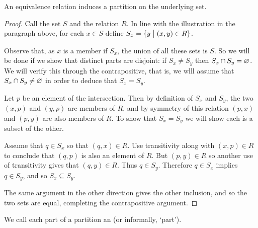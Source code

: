 \medskip
\par{}
An equivalence relation induces a partition on the underlying set.

\begin{proof}
Call the set \( S \) and the relation \( R \).
In line with the illustration in the paragraph above, 
for each \( x\in S \) define \( S_x=\mbox{$\{y\bigm| (x,y)\in R\}$} \).

Observe that, as \( x \) is a member if \( S_x \),
the union of all these sets is \( S \).
So we will be done if we show that distinct parts are disjoint:
if \( S_x\neq S_y \) then \( S_x\cap S_y=\varnothing \).
We will verify this through the contrapositive, that is, 
we wlll assume that \( S_x\cap S_y\neq\varnothing \) in order to
deduce that \( S_x=S_y \).

Let \( p \) be an element of the intersection. 
Then by definition of $S_x$ and $S_y$, the two 
\( (x,p) \) and 
\( (y,p) \) are members of $R$, and by symmetry of this relation
\( (p,x) \) and
\( (p,y) \) are also members of \( R \).
To show that \( S_x=S_y \) we will show each is a subset of the other.

Assume that \( q\in S_x \) so that \( (q,x)\in R \).
Use transitivity along with
\( (x,p)\in R \) to conclude that \( (q,p) \) is also an element of \( R \).
But \( (p,y)\in R \) so another use of transitivity gives that
\( (q,y)\in  R \).
Thus \( q\in S_y \).
Therefore \( q\in S_x \) implies \( q\in S_y \), 
and so \( S_x\subseteq S_y \).

The same argument in the other direction gives the other inclusion, and
so the two sets are equal, completing the contrapositive argument. 
\end{proof}

We call each part of a partition an %
(or informally, `part').


